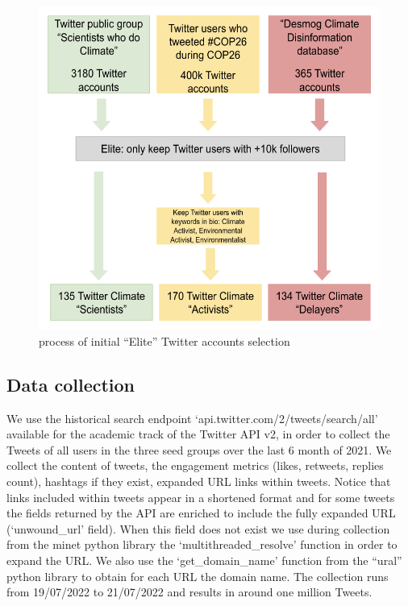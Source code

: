 \documentclass{article}
\begin{document}
\begin{figure}
	\centering
	\includegraphics[scale=0.8]{./img/actors.png}
	\caption{process of initial “Elite” Twitter accounts selection}
	\label{actors}
\end{figure}
\subsection{Data collection}

We use the historical search endpoint ‘api.twitter.com/2/tweets/search/all’ available for the academic track of the Twitter API v2, in order to collect the Tweets of all users in the three seed groups over the last 6 month of 2021. We collect the content of tweets, the engagement metrics (likes, retweets, replies count), hashtags if they exist, expanded URL links within tweets. Notice that links included within tweets appear in a shortened format and for some tweets the fields returned by the API are enriched to include the fully expanded URL (‘unwound\_url’ field). When this field does not exist we use during collection from the minet python library the ‘multithreaded\_resolve’ function in order to expand the URL. We also use the ‘get\_domain\_name’ function from the “ural” python library to obtain for each URL the domain name. The collection runs from 19/07/2022 to 21/07/2022 and results in around one million Tweets.
\end{document}

